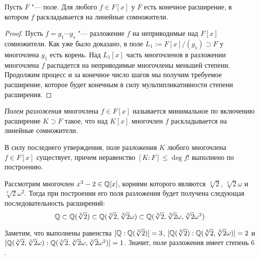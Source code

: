 \begin{proposition}
	Пусть $F$ "--- поле. Для любого $f \in F[x]$ у $F$ есть конечное расширение, в котором $f$ раскладывается на линейные сомножители.
\end{proposition}

\begin{proof}
	Пусть $f = g_1\dotsm g_s$ "--- разложение $f$ на неприводимые над $F[x]$ сомножители. Как уже было доказано, в поле $L_1 := F[x] / (g_1) \supset F$ у многочлена $g_1$ есть корень. Над $L_1[x]$ часть многочленов в разложении многочлена $f$ распадется на неприводимые многочлены меньшей степени. Продолжим процесс и за конечное число шагов мы получим требуемое расширение, которое будет конечным в силу мультипликативности степени расширения.
\end{proof}

\begin{definition}
	\textit{Полем разложения} многочлена $f \in F[x]$ называется минимальное по включению расширение $K \supset F$ такое, что над $K[x]$ многочлен $f$ раскладывается на линейные сомножители.
\end{definition}

\begin{note}
	В силу последнего утверждения, поле разложения $K$ любого многочлена $f \in F[x]$ существует, причем неравенство $[K : F] \le \deg{f}!$ выполнено по построению.
\end{note}

\begin{example}
	Рассмотрим многочлен $x^3 - 2 \in \mathbb{Q}[x]$, корнями которого являются $\sqrt[3]{2}$, $\sqrt[3]{2}\omega$ и $\sqrt[3]{2}\omega^2$. Тогда при построении его поля разложения будет получена следующая последовательность расширений:
	\[\mathbb{Q} \subset \mathbb{Q}(\sqrt[3]{2}) \subset \mathbb{Q}(\sqrt[3]{2}, \sqrt[3]{2}\omega) \subset \mathbb{Q}(\sqrt[3]{2}, \sqrt[3]{2}\omega, \sqrt[3]{2}\omega^2)\]
	
	Заметим, что выполнены равенства $[\mathbb{Q} : \mathbb{Q}(\sqrt[3]{2})] = 3$, $[\mathbb{Q}(\sqrt[3]{2}) : \mathbb{Q}(\sqrt[3]{2}, \sqrt[3]{2}\omega)] = 2$ и $[\mathbb{Q}(\sqrt[3]{2}, \sqrt[3]{2}\omega) : \mathbb{Q}(\sqrt[3]{2}, \sqrt[3]{2}\omega, \sqrt[3]{2}\omega^2)] = 1$. Значит, поле разложения имеет степень $6$.
\end{example}